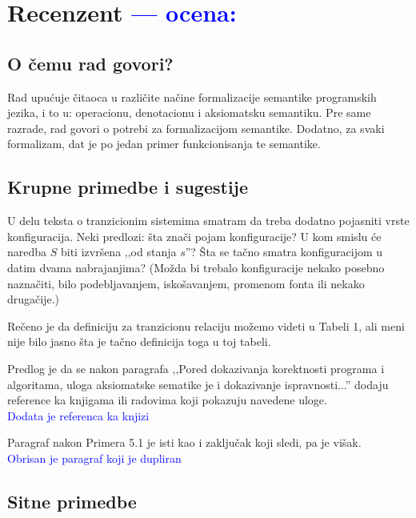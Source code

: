 \documentclass[a4paper]{report}
\newcommand{\odgovor}[1]{\textcolor{blue}{#1}}
\begin{document}
\chapter{Recenzent \odgovor{--- ocena:}}

\section{O čemu rad govori?}

{Rad upućuje čitaoca u različite načine formalizacije semantike programskih jezika, i to u: operacionu, denotacionu i aksiomatsku semantiku. Pre same razrade, rad govori o potrebi za formalizacijom semantike. Dodatno, za svaki formalizam, dat je po jedan primer funkcionisanja te semantike.}

\section{Krupne primedbe i sugestije}

{U delu teksta o tranzicionim sistemima smatram da treba dodatno pojasniti vrste konfiguracija. Neki predlozi: šta znači pojam konfiguracije? U kom smislu će naredba $S$ biti izvršena ‚‚od stanja $s$''? Šta se tačno smatra konfiguracijom u datim dvama nabrajanjima? (Možda bi trebalo konfiguracije nekako posebno naznačiti, bilo podebljavanjem, iskošavanjem, promenom fonta ili nekako drugačije.)}
	
{Rečeno je da definiciju za tranzicionu relaciju možemo videti u Tabeli 1, ali meni nije bilo jasno šta je tačno definicija toga u toj tabeli.}
	
{Predlog je da se nakon paragrafa ‚‚Pored dokazivanja korektnosti programa i algoritama, uloga aksiomatske sematike je i dokazivanje ispravnosti...'' dodaju reference ka knjigama ili radovima koji pokazuju navedene uloge.}  \\
\odgovor {Dodata je referenca ka knjizi}
	
{Paragraf nakon Primera 5.1 je isti kao i zaključak koji sledi, pa je višak.} \\
\odgovor {Obrisan je paragraf koji je dupliran}

\section{Sitne primedbe}
\end{document}
